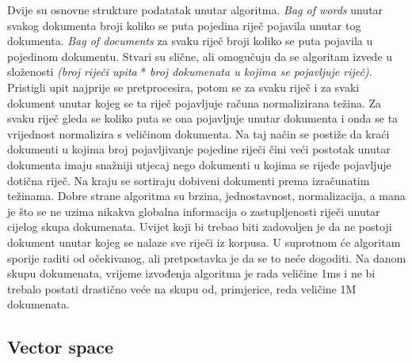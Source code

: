 \documentclass[a4paper,12pt]{article}
\begin{document}
Dvije su osnovne strukture podatatak unutar algoritma. \textit{Bag of words} unutar svakog dokumenta broji koliko se puta pojedina riječ pojavila unutar tog dokumenta. \textit{Bag of documents} za svaku riječ broji koliko se puta pojavila u pojedinom dokumentu. Stvari su slične, ali omogučuju da se algoritam izvede u složenosti \textit{(broj riječi upita} * \textit{broj dokumenata u kojima se pojavljuje riječ)}. Pristigli upit najprije se pretprocesira, potom se za svaku riječ i za svaki dokument unutar kojeg se ta riječ pojavljuje računa normalizirana težina. Za svaku riječ  gleda se koliko puta se ona pojavljuje unutar dokumenta i onda se ta vrijednost normalizira s veličinom dokumenta. Na taj način se postiže da kraći dokumenti u kojima broj pojavljivanje pojedine riječi čini veći postotak unutar dokumenta imaju snažniji utjecaj nego dokumenti u kojima se rijeđe pojavljuje dotična riječ. Na kraju se sortiraju dobiveni dokumenti prema izračunatim težinama. Dobre strane algoritma su brzina, jednostavnost, normalizacija, a mana je što se ne uzima nikakva globalna informacija o zastupljenosti riječi unutar cijelog skupa dokumenata. Uvijet koji bi trebao biti zadovoljen je da ne postoji dokument unutar kojeg se nalaze sve riječi iz korpusa. U suprotnom će algoritam sporije raditi od očekivanog, ali pretpostavka je da se to neće dogoditi. Na danom skupu dokumenata, vrijeme izvođenja algoritma je rada veličine 1ms i ne bi trebalo postati drastično veće na skupu od, primjerice, reda veličine 1M dokumenata.

\subsection{Vector space}
\end{document}
